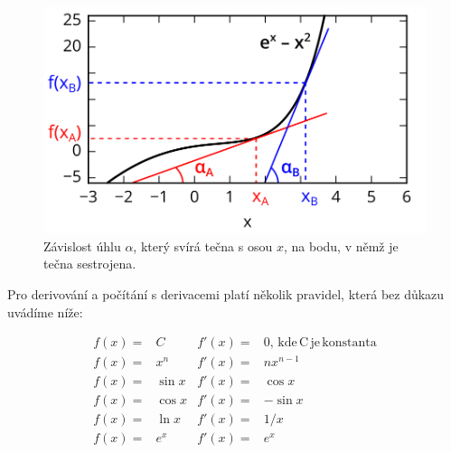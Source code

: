 \documentclass[a4paper,oneside,12pt]{article}
\begin{document}
\begin{figure}
\begin{center}
\includegraphics{./IMGS/tecny-drawing.png}
\end{center}
\caption{Závislost úhlu $\alpha$, který svírá tečna s osou $x$,
na bodu, v němž je tečna sestrojena.}
\label{fig:tecny}
\end{figure}
%
Pro derivování a počítání s derivacemi platí několik pravidel,
která bez důkazu uvádíme níže:

\begin{align*}
f(x) = {} & C    & f'(x) = {} & 0, \mathrm{\,kde\,C\,je\,konstanta}  \\
f(x) = {} & x^n    & f'(x) = {} & n x^{n-1} \\
f(x) = {} & \sin x & f'(x) = {} & \cos x \\
f(x) = {} & \cos x & f'(x) = {} & - \sin x \\
f(x) = {} & \ln x  & f'(x) = {} & 1/x \\
f(x) = {} & e^x    & f'(x) = {} & e^x \\
\end{align*}

\end{document}

